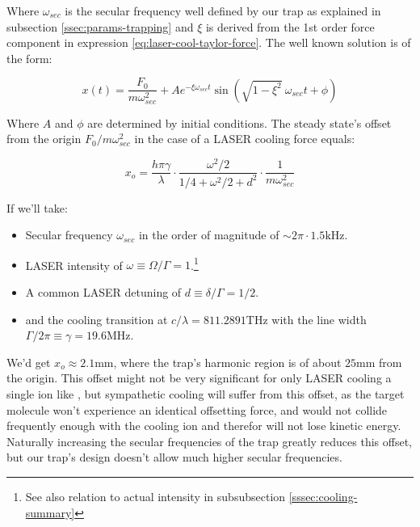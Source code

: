 Where $\omega_{sec}$ is the secular frequency well defined by our trap as explained in subsection \ref{ssec:params-trapping} and $\xi$ is derived from the 1st order force component in expression \ref{eq:laser-cool-taylor-force}. The well known solution is of the form: 

\begin{equation}
	x(t) = \frac{F_0}{m \omega_{sec}^2} + A e^{-\xi \omega_{sec} t} \sin(\sqrt{1-\xi^2}\ \omega_{sec} t + \phi)
\end{equation}

Where $A$ and $\phi$ are determined by initial conditions. The steady state's offset from the origin $F_0/m\omega_{sec}^2$ in the case of a LASER cooling force equals:

\begin{equation}
x_o = \frac{h \pi \gamma}{\lambda}\cdot\frac{\omega^2/2}{1/4+\omega^2/2 + d^2} \cdot\frac{1}{m \omega_{sec}^2}
\end{equation}

If we'll take:

\begin{itemize}
	\item Secular frequency $\omega_{sec}$ in the order of magnitude of $\sim 2\pi\cdot 1.5\mathrm{kHz}$.
	\item LASER intensity of $\omega \equiv \Omega/\Gamma = 1$.\footnote{See also relation to actual intensity in subsubsection \ref{sssec:cooling-summary}}
	\item A common LASER detuning of $d \equiv \delta/\Gamma = 1/2$. %
	\item {} and the cooling transition at $c/\lambda = 811.2891 \mathrm{THz}$ with the line width $\Gamma/2\pi \equiv \gamma = 19.6 \mathrm{MHz}$.\cite{RansfordThesis}
\end{itemize}

We'd get $x_o \approx 2.1 \mathrm{mm}$, where the trap's harmonic region is of about $25 \mathrm{mm}$ from the origin. This offset might not be very significant for only LASER cooling a single ion like , but sympathetic cooling will suffer from this offset, as the target molecule won't experience an identical offsetting force, and would not collide frequently enough with the cooling ion and therefor will not lose kinetic energy. Naturally increasing the secular frequencies of the trap greatly reduces this offset, but our trap's design doesn't allow much higher secular frequencies.

